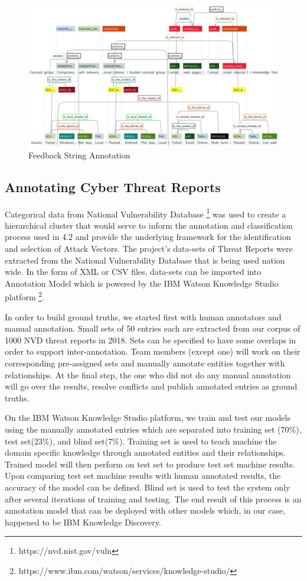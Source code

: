 \documentclass[conference]{IEEEtran}
\begin{document}
\begin{figure}[ht]
  \centering
  \includegraphics[width=16cm]{./images/feedbackString}
  \caption{Feedback String Annotation}
  \label{Figure:feedbackString}
\end{figure}

\subsection{Annotating Cyber Threat Reports} 
Categorical data from National Vulnerability Database \footnote{https://nvd.nist.gov/vuln} was used to create a hierarchical cluster that would serve to inform the annotation and classification process used in 4.2 and provide the underlying framework for the identification and selection of Attack Vectors. The project's data-sets of Threat Reports were extracted from the National Vulnerability Database that is being used nation wide. In the form of XML or CSV files, data-sets can be imported into Annotation Model which is powered by the IBM Watson Knowledge Studio platform \footnote{https://www.ibm.com/watson/services/knowledge-studio/}.

In order to build ground truths, we started first with human annotators and manual annotation. Small sets of 50 entries each are extracted from our corpus of 1000 NVD threat reports in 2018. Sets can be specified to have some overlaps in order to support inter-annotation. Team members (except one) will work on their corresponding pre-assigned sets and manually annotate entities together with relationships. At the final step, the one who did not do any manual annotation will go over the results, resolve conflicts and publish annotated entries as ground truths.

On the IBM Watson Knowledge Studio platform, we train and test our models using the manually annotated entries which are separated into training set (70\%), test set(23\%), and blind set(7\%). Training set is used to teach machine the domain specific knowledge through annotated entities and their relationships. Trained model will then perform on test set to produce test set machine results. Upon comparing test set machine results with human annotated results, the accuracy of the model can be defined. Blind set is used to test the system only after several iterations of training and testing. The end result of this process is an annotation model that can be deployed with other models which, in our case, happened to be IBM Knowledge Discovery.
\end{document}
